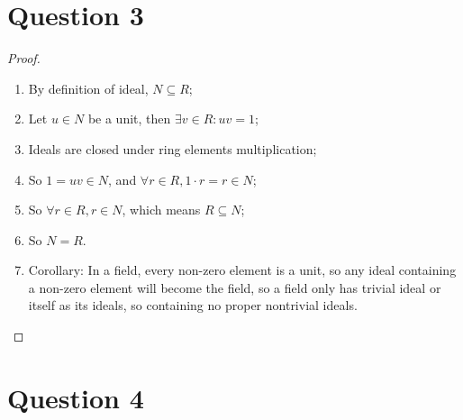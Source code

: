 \documentclass{article}
\begin{document}
\newpage

\section*{Question 3}

\begin{proof}
~
    \begin{enumerate}
        \item By definition of ideal, $N\subseteq R$;
        \item Let $u\in N$ be a unit, then $\exists v\in R:uv=1$;
        \item Ideals are closed under ring elements multiplication;
        \item So $1=uv\in N$, and $\forall r\in R, 1\cdot r=r\in N$;
        \item So $\forall r\in R, r\in N$, which means $R\subseteq N$;
        \item So $N=R$.
        \item Corollary: In a field, every non-zero element is a unit, so any ideal containing a non-zero element will become the field, so a field only has trivial ideal or itself as its ideals, so containing no proper nontrivial ideals.
    \end{enumerate}
\end{proof}

\newpage

\section*{Question 4}
\end{document}
